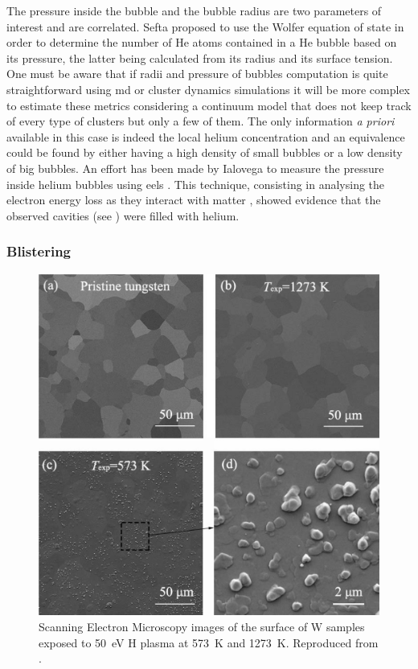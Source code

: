 The pressure inside the bubble and the bubble radius are two parameters of interest and are correlated.
Sefta  proposed to use the Wolfer equation of state in order to determine the number of He atoms contained in a He bubble based on its pressure, the latter being calculated from its radius and its surface tension.
One must be aware that if radii and pressure of bubbles computation is quite straightforward using \gls{md}  or cluster dynamics  simulations it will be more complex to estimate these metrics considering a continuum model that does not keep track of every type of clusters but only a few of them.
The only information \textit{a priori} available in this case is indeed the local helium concentration and an equivalence could be found by either having a high density of small bubbles or a low density of big bubbles.
An effort has been made by Ialovega to measure the pressure inside helium bubbles using \gls{eels} .
This technique, consisting in analysing the electron energy loss as they interact with matter , showed evidence that the observed cavities (see ) were filled with helium.

\subsubsection{Blistering}

\begin{figure}
    \centering
    \includegraphics[width=\linewidth]{Figures/Chapter1/h_blisters_in_tungsten.jpg}
    \caption{Scanning Electron Microscopy images of the surface of W samples exposed to \SI{50}{eV} H plasma at \SI{573}{K} and \SI{1273}{K}. Reproduced from \cite{chen_irradiation_2019}.}
\end{figure}

